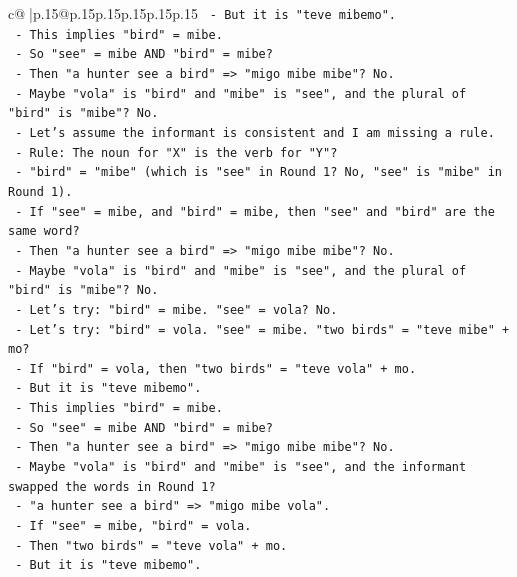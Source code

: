 \documentclass{article}
\begin{document}
{\begin{supertabular}{c@{$\;$}|p{.15\linewidth}@{}p{.15\linewidth}p{.15\linewidth}p{.15\linewidth}p{.15\linewidth}p{.15\linewidth}}
{{{\texttt{      {-} But it is "teve mibemo".} \\
\texttt{      {-} This implies "bird" = mibe.} \\
\texttt{      {-} So "see" = mibe AND "bird" = mibe?} \\
\texttt{      {-} Then "a hunter see a bird" => "migo mibe mibe"? No.} \\
\texttt{      {-} Maybe "vola" is "bird" and "mibe" is "see", and the plural of "bird" is "mibe"? No.} \\
\texttt{      {-} Let's assume the informant is consistent and I am missing a rule.} \\
\texttt{      {-} Rule: The noun for "X" is the verb for "Y"?} \\
\texttt{        {-} "bird" = "mibe" (which is "see" in Round 1? No, "see" is "mibe" in Round 1).} \\
\texttt{        {-} If "see" = mibe, and "bird" = mibe, then "see" and "bird" are the same word?} \\
\texttt{        {-} Then "a hunter see a bird" => "migo mibe mibe"? No.} \\
\texttt{        {-} Maybe "vola" is "bird" and "mibe" is "see", and the plural of "bird" is "mibe"? No.} \\
\texttt{        {-} Let's try: "bird" = mibe. "see" = vola? No.} \\
\texttt{        {-} Let's try: "bird" = vola. "see" = mibe. "two birds" = "teve mibe" + mo?} \\
\texttt{        {-} If "bird" = vola, then "two birds" = "teve vola" + mo.} \\
\texttt{        {-} But it is "teve mibemo".} \\
\texttt{        {-} This implies "bird" = mibe.} \\
\texttt{        {-} So "see" = mibe AND "bird" = mibe?} \\
\texttt{        {-} Then "a hunter see a bird" => "migo mibe mibe"? No.} \\
\texttt{        {-} Maybe "vola" is "bird" and "mibe" is "see", and the informant swapped the words in Round 1?} \\
\texttt{        {-} "a hunter see a bird" => "migo mibe vola".} \\
\texttt{        {-} If "see" = mibe, "bird" = vola.} \\
\texttt{        {-} Then "two birds" = "teve vola" + mo.} \\
\texttt{        {-} But it is "teve mibemo".} \\
}}}
\end{supertabular}}
\end{document}
